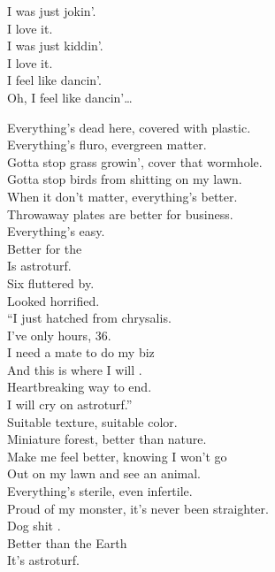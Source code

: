 I was just jokin'. \\
I love it. \\
I was just kiddin'. \\
I love it. \\

I feel like dancin'. \\
Oh, I feel like dancin'… \\





Everything's dead here, covered with plastic. \\
Everything's fluro, evergreen matter. \\
Gotta stop grass growin', cover that wormhole. \\
Gotta stop birds from shitting on my lawn. \\

When it don't matter, everything's better. \\
Throwaway plates are better for business. \\
Everything's easy. \\
Better for the  \\
Is astroturf. \\

Six  fluttered by. \\
Looked horrified. \\
``I just hatched from chrysalis. \\
I've only hours, 36. \\
I need a mate to do my biz \\
And this is where I will . \\
Heartbreaking way to end. \\
I will cry on astroturf.'' \\

Suitable texture, suitable color. \\
Miniature forest, better than nature. \\
Make me feel better, knowing I won't go \\
Out on my lawn and see an animal. \\

Everything's sterile, even infertile. \\
Proud of my monster, it's never been straighter. \\
Dog shit . \\
Better than the Earth \\
It's astroturf. \\

